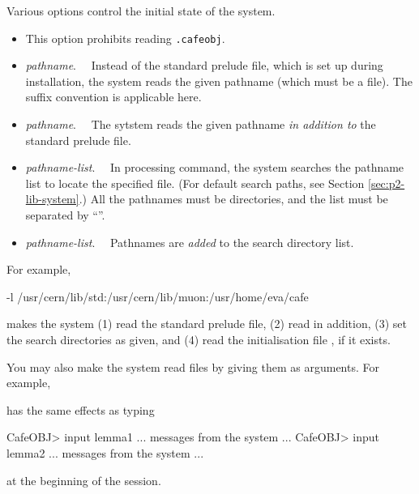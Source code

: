 \documentclass[a4paper]{memoir}
\begin{document}
Various options control the initial state of
the system.
\begin{itemize}
\item[\kbd{-q}] This option prohibits reading \verb|.cafeobj|.
\item[\kbd{-p}] \emph{pathname}.~~ Instead of the standard prelude
  file, which is set up during installation,
  the system reads the given pathname (which must be a file).
  The suffix convention is applicable here.
\item[\kbd{+p}] {\em pathname}. ~~The sytstem reads the given pathname
  {\em in addition to} the standard prelude file.
\item[\kbd{-l}] {\em pathname-list}. ~~In processing  command,
  the system searches the pathname list to locate the specified file.
  (For default search paths, see Section \ref{sec:p2-lib-system}.)
  All the pathnames must be directories, and the list must be separated
  by ``\kbd{:}''.
\item[\kbd{+l}] {\em pathname-list}. ~~Pathnames are {\em added} to
  the search directory list.
\end{itemize}
For example,
\begin{vvtm}
\begin{ccode}
            -l /usr/cern/lib/std:/usr/cern/lib/muon:/usr/home/eva/cafe
\end{ccode}
\end{vvtm}
makes the system (1) read the standard prelude file, (2) read
 in addition, (3) set the search directories as given,
and (4) read the initialisation file , if it exists.


You may also make the system read files by giving them as arguments.
For example,
\begin{vvtm}
\begin{ccode}
\end{ccode}
\end{vvtm}
has the same effects as typing
\begin{vvtm}
\begin{ccode}
  CafeOBJ> input lemma1
  ... messages from the system ...
  CafeOBJ> input lemma2
  ... messages from the system ...
\end{ccode}
\end{vvtm}
at the beginning of the session.
\end{document}
